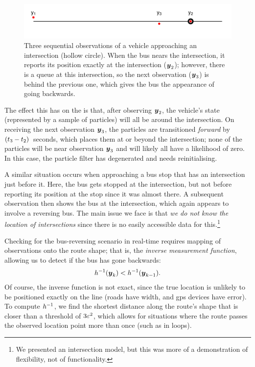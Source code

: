 \begin{knitrout}\small
{}\color{fgcolor}\begin{figure}

{\centering \includegraphics[width=.8\textwidth]{figure/bus_going_backwards-1} 

}

\caption[Three sequential observations of a vehicle approaching an intersection (hollow circle)]{Three sequential observations of a vehicle approaching an intersection (hollow circle). When the bus nears the intersection, it reports its position exactly at the intersection ($\boldsymbol{y}_2$); however, there is a queue at this intersection, so the next observation ($\boldsymbol{y}_3$) is behind the previous one, which gives the bus the appearance of going backwards.}\label{fig:bus_going_backwards}
\end{figure}


\end{knitrout}


The effect this has on the \pf{} is that, after observing $\boldsymbol{y}_2$, the vehicle's state (represented by a sample of particles) will all be around the intersection. On receiving the next observation $\boldsymbol{y}_3$, the particles are transitioned \emph{forward} by $(t_3 - t_2)$~seconds, which places them at or beyond the intersection; none of the particles will be near observation $\boldsymbol{y}_3$ and will likely all have a likelihood of zero. In this case, the particle filter has degenerated and needs reinitialising.


A similar situation occurs when approaching a bus stop that has an intersection just before it. Here, the bus gets stopped at the intersection, but not before reporting its position at the stop since it was almost there. A subsequent observation then shows the bus at the intersection, which again appears to involve a reversing bus. The main issue we face is that \emph{we do not know the location of intersections} since there is no easily accessible data for this.\footnote{We presented an intersection model, but this was more of a demonstration of flexibility, not of functionality.}


Checking for the bus-reversing scenario in real-time requires mapping of observations onto the route shape; that is, the \emph{inverse measurement function}, allowing us to detect if the bus has gone backwards:
\begin{equation}
\label{eq:vehicle_rev_check}
h^{-1}(\boldsymbol{y}_k) < h^{-1}(\boldsymbol{y}_{k-1}).
\end{equation}
Of course, the inverse function is not exact, since the true location is unlikely to be positioned exactly on the line (roads have width, and \gls{gps} devices have error). To compute $h^{-1}$, we find the shortest distance along the route's shape that is closer than a threshold of $3\varepsilon^2$, which allows for situations where the route passes the observed location point more than once (such as in loops).

